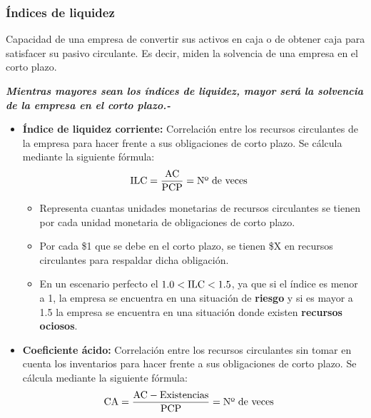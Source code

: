 \documentclass{templateNote}
\begin{document}
\subsubsection{Índices de liquidez}
\noindent Capacidad de una empresa de convertir sus activos en caja o de obtener caja para satisfacer su pasivo circulante. Es decir, miden la solvencia de una empresa en el corto plazo.

\begin{tcolorbox}[colback=orange!10!white,colframe=orange!60!black,title=Observación]
    \textit{\textbf{Mientras mayores sean los índices de liquidez, mayor será la solvencia de la empresa en el corto plazo.-}}
\end{tcolorbox}

\begin{itemize}
    \item \textbf{Índice de liquidez corriente:} Correlación entre los recursos circulantes de la empresa para hacer frente a sus obligaciones de corto plazo. Se cálcula mediante la siguiente fórmula:
    \begin{align*}
        \textnormal{ILC} &= \frac{\textnormal{AC}}{\textnormal{PCP}} = \textnormal{Nº de veces}
    \end{align*}
    
    \begin{itemize}
        \item Representa cuantas unidades monetarias de recursos circulantes se tienen por cada unidad monetaria de obligaciones de corto plazo.
        \item Por cada \$1 que se debe en el corto plazo, se tienen \$X en recursos circulantes para respaldar dicha obligación.
        \item En un escenario perfecto el \textbf{$1.0 < \textnormal{ILC} < 1.5$}, ya que si el índice es menor a 1, la empresa se encuentra en una situación de \textbf{riesgo} y si es mayor a 1.5 la empresa se encuentra en una situación donde existen \textbf{recursos ociosos}.
    \end{itemize}

    \item \textbf{Coeficiente ácido:} Correlación entre los recursos circulantes sin tomar en cuenta los inventarios para hacer frente a sus obligaciones de corto plazo. Se cálcula mediante la siguiente fórmula:
    \begin{align*}
        \textnormal{CA} &= \frac{\textnormal{AC} - \textnormal{Existencias}}{\textnormal{PCP}} = \textnormal{Nº de veces}
    \end{align*} 


\end{itemize}
\end{document}
